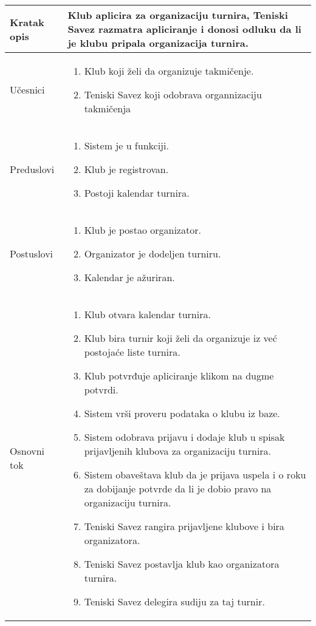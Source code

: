 \documentclass{article}
\begin{document}
\begin{longtable}{| p{} | p{} |} 
\hline
    Kratak opis & Klub aplicira za organizaciju turnira, Teniski Savez razmatra apliciranje i donosi odluku da li je klubu pripala organizacija turnira.\\ 
\hline    
    Učesnici & \begin{enumerate}
        \item Klub koji želi da organizuje takmičenje.
        \item Teniski Savez koji odobrava organnizaciju takmičenja
    \end{enumerate}
    \\
\hline
   Preduslovi & \begin{enumerate}
       \item Sistem je u funkciji.
       \item Klub je registrovan.
       \item Postoji kalendar turnira.
   \end{enumerate}\\
\hline  
    Postuslovi & \begin{enumerate}
        \item Klub je postao organizator.
        \item Organizator je dodeljen turniru.
        \item Kalendar je ažuriran.
    \end{enumerate}\\
\hline
    Osnovni tok & \begin{enumerate}
        \item Klub otvara kalendar turnira.
        \item Klub bira turnir koji želi da organizuje iz već postojaće liste turnira.
        \item Klub potvrđuje apliciranje klikom na dugme potvrdi. 
        \item Sistem vrši proveru podataka o klubu iz baze.
        \item Sistem odobrava prijavu i dodaje klub u spisak prijavljenih klubova za organizaciju turnira.
        \item Sistem obaveštava klub da je prijava uspela i o roku za dobijanje potvrde da li je dobio pravo na organizaciju turnira.
        \item Teniski Savez rangira prijavljene klubove i bira organizatora.
        \item Teniski Savez postavlja klub kao organizatora turnira.
        \item Teniski Savez delegira sudiju za taj turnir.

\end{enumerate}
\end{longtable}
\end{document}
